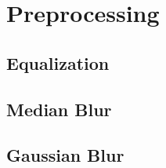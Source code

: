 \section{Preprocessing}

\subsection{Equalization}
\subsection{Median Blur}
\subsection{Gaussian Blur}